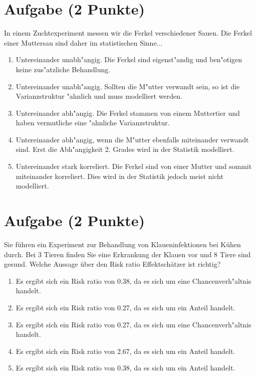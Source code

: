 \documentclass[a4paper, 9pt]{scrartcl}\usepackage[]{graphicx}\usepackage[]{xcolor}
\begin{document}
\section{Aufgabe \hfill (2 Punkte)}

In einem Zuchtexperiment messen wir die Ferkel verschiedener Sauen. Die
Ferkel einer Muttersau sind daher im statistischen Sinne... 



\begin{enumerate}
\item [\textbf{A} \msquare] Untereinander unabh{"a}ngig. Die Ferkel sind eigenst{"a}ndig und ben{"o}tigen keine zus{"a}tzliche Behandlung.
\item [\textbf{B} \msquare] Untereinander unabh{"a}ngig. Sollten die M{"u}tter verwandt sein, so ist die Varianzstruktur {"a}hnlich und muss modelliert werden.
\item [\textbf{C} \msquare] Untereinander abh{"a}ngig. Die Ferkel stammen von einem Muttertier und haben vermutliche eine {"a}hnliche Varianzstruktur.
\item [\textbf{D} \msquare] Untereinander abh{"a}ngig, wenn die M{"u}tter ebenfalls miteinander verwandt sind. Erst die Abh{"a}ngigkeit 2. Grades wird in der Statistik modelliert.
\item [\textbf{E} \msquare] Untereinander stark korreliert. Die Ferkel sind von einer Mutter und sommit miteinander korreliert. Dies wird in der Statistik jedoch meist nicht modelliert.
\end{enumerate}

\section{Aufgabe \hfill (2 Punkte)}



Sie f{\"u}hren ein Experiment zur Behandlung von Klaueninfektionen bei K{\"u}hen
durch. Bei 3 Tieren finden Sie eine Erkrankung der Klauen vor und
8 Tiere sind gesund. Welche Aussage {\"u}ber den Risk ratio
Effektsch{\"a}tzer ist richtig?



\begin{enumerate}
\item [\textbf{A} \msquare] Es ergibt sich ein Risk ratio von 0.38, da es sich um eine Chancenverh{"a}ltnis handelt.
\item [\textbf{B} \msquare] Es ergibt sich ein Risk ratio von 0.27, da es sich um ein Anteil handelt.
\item [\textbf{C} \msquare] Es ergibt sich ein Risk ratio von 0.27, da es sich um eine Chancenverh{"a}ltnis handelt.
\item [\textbf{D} \msquare] Es ergibt sich ein Risk ratio von 2.67, da es sich um ein Anteil handelt.
\item [\textbf{E} \msquare] Es ergibt sich ein Risk ratio von 0.38, da es sich um ein Anteil handelt.
\end{enumerate}
\end{document}
